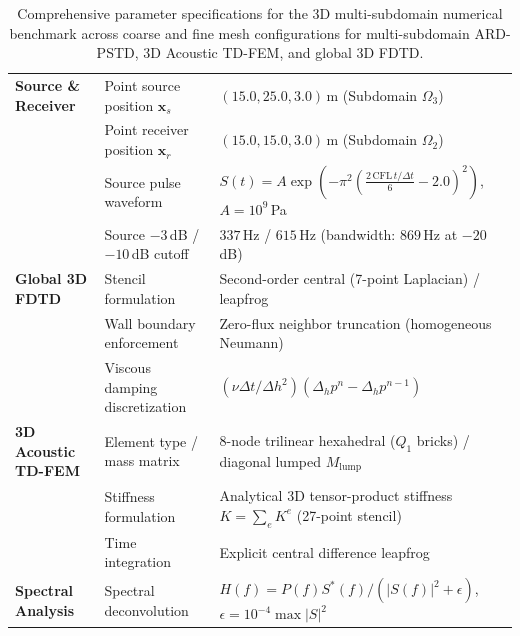 \documentclass{Configuration_Files/PoliMi3i_thesis}
\newif\ifshowthesischanges
\DeclareRobustCommand{\thesischange}[2]{%
    \ifshowthesischanges
        \textcolor{#1}{#2}%
    \else
        #2%
    \fi
}
\def\thesischange#1#2{#2}%
\begin{document}
\begin{table}[H]
{{\begin{tabular}{lll}
\midrule
\textbf{Source \& Receiver} 
& Point source position $\mathbf{x}_s$ & $(15.0, 25.0, 3.0)$\,m (Subdomain $\Omega_3$) \\
& Point receiver position $\mathbf{x}_r$ & $(15.0, 15.0, 3.0)$\,m (Subdomain $\Omega_2$) \\
& Source pulse waveform & $S(t) = A \exp\left(-\pi^2 \left(\frac{2 \, \mathrm{CFL} \, t / \Delta t}{6} - 2.0\right)^2\right)$, $A = 10^9$\,Pa \\
& Source $-3$\,dB / $-10$\,dB cutoff & $337$\,Hz / $615$\,Hz (bandwidth: $869$\,Hz at $-20$\,dB) \\
\midrule
\textbf{Global 3D FDTD} 
& Stencil formulation & Second-order central (7-point Laplacian) / leapfrog \\
& Wall boundary enforcement & Zero-flux neighbor truncation (homogeneous Neumann) \\
& Viscous damping discretization & $(\nu \Delta t / \Delta h^2) (\Delta_h p^n - \Delta_h p^{n-1})$ \\
\midrule
\textbf{3D Acoustic TD-FEM} 
& Element type / mass matrix & 8-node trilinear hexahedral ($Q_1$ bricks) / diagonal lumped $M_{\mathrm{lump}}$ \\
& Stiffness formulation & Analytical 3D tensor-product stiffness $K = \sum_e K^e$ (27-point stencil) \\
& Time integration & Explicit central difference leapfrog \\
\midrule
\textbf{Spectral Analysis} 
& Spectral deconvolution & $H(f) = P(f) S^*(f) / (|S(f)|^2 + \epsilon)$, $\epsilon = 10^{-4} \max |S|^2$ \\
\bottomrule
\end{tabular}%
}
}
\caption[\thesischange{red}{Comprehensive parameter specifications for the 3D comparative solvers}]{\thesischange{red}{Comprehensive parameter specifications for the 3D multi-subdomain numerical benchmark across coarse and fine mesh configurations for multi-subdomain ARD-PSTD, 3D Acoustic TD-FEM, and global 3D FDTD.}}
\label{tab:ard_3d_simulation_parameters}
\end{table}
\end{document}
